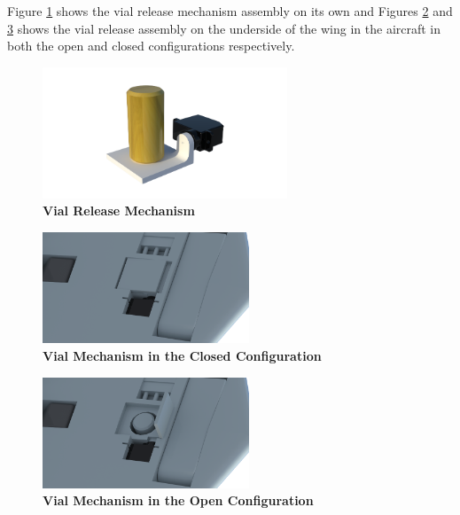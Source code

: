         Figure \ref{fig:vial_assembly} shows the vial release mechanism assembly on its own and Figures \ref{fig:vial_closed} and \ref{fig:vial_open} shows the vial release assembly on the underside of the wing in the aircraft in both the open and closed configurations respectively.
        
        \begin{figure}[H]
            \centering
            \includegraphics[width=0.65\textwidth]{homeworks/homework4/report/Figure/assembly_vial_door.png}
            \caption{\textbf{Vial Release Mechanism}}
            \label{fig:vial_assembly}
        \end{figure}
                
        \begin{figure}[H]
            \centering
            \includegraphics[width=0.55\textwidth]{homeworks/homework4/report/Figure/aircraft_assembly_door_closed.png}
            \caption{\textbf{Vial Mechanism in the Closed Configuration}}
            \label{fig:vial_closed}
        \end{figure}
        
        \begin{figure}[H]
            \centering
            \includegraphics[width=0.55\textwidth]{homeworks/homework4/report/Figure/aircraft_assembly_door_open.png}
            \caption{\textbf{Vial Mechanism in the Open Configuration}}
            \label{fig:vial_open}
        \end{figure}
        
